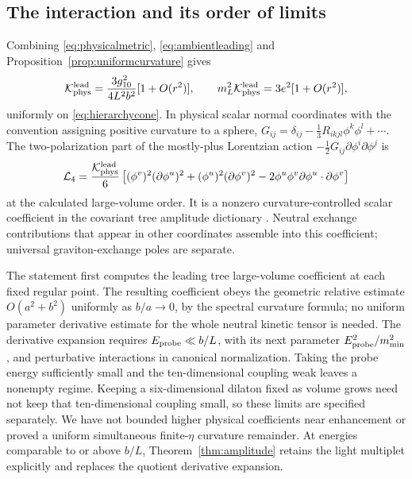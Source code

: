 \subsection{The interaction and its order of limits}
Combining \eqref{eq:physicalmetric}, \eqref{eq:ambientleading}
and Proposition~\ref{prop:uniformcurvature} gives
\begin{equation}\label{eq:physicaluniformcurvature}
 \mathcal K_{\rm phys}^{\rm lead}
 =\frac{3g_{10}^2}{4L^2b^2}[1+O(r^2)],\qquad
 m_L^2\mathcal K_{\rm phys}^{\rm lead}=3e^2[1+O(r^2)],
\end{equation}
uniformly on \eqref{eq:hierarchycone}. In physical scalar normal coordinates
with the convention assigning positive curvature to a sphere,
$G_{ij}=\delta_{ij}-\tfrac13R_{ikjl}\phi^k\phi^l+\cdots$.
The two-polarization part of the mostly-plus Lorentzian action
$-\tfrac12G_{ij}\partial\phi^i\partial\phi^j$ is
\begin{equation}\label{eq:interaction}
 \mathcal L_4=\frac{\mathcal K_{\rm phys}^{\rm lead}}6
 \left[(\phi^v)^2(\partial\phi^u)^2
       +(\phi^u)^2(\partial\phi^v)^2
       -2\phi^u\phi^v\partial\phi^u\cdot\partial\phi^v\right]
\end{equation}
at the calculated large-volume order. It is a nonzero
curvature-controlled scalar coefficient in the covariant tree
amplitude dictionary \cite{cheung}. Neutral exchange contributions
that appear in other coordinates assemble into this coefficient;
universal graviton-exchange poles are separate.

The statement first computes the leading tree large-volume
coefficient at each fixed regular point. The resulting coefficient
obeys the geometric relative estimate $O(a^2+b^2)$ uniformly as
$b/a\to0$, by the spectral curvature formula; no uniform parameter
derivative estimate for the whole neutral kinetic tensor is needed.
The derivative expansion requires
$E_{\rm probe}\ll b/L$, with its next parameter
$E_{\rm probe}^2/m_{\min}^2$, and perturbative interactions in
canonical normalization. Taking the probe energy sufficiently
small and the ten-dimensional coupling weak leaves a nonempty
regime. Keeping a six-dimensional dilaton fixed as volume grows
need not keep that ten-dimensional coupling small, so these
limits are specified separately. We have not bounded higher
physical coefficients near enhancement or proved a uniform simultaneous
finite-$\eta$ curvature remainder. At energies comparable to or above
$b/L$, Theorem~\ref{thm:amplitude} retains the light multiplet explicitly
and replaces the quotient derivative expansion.

